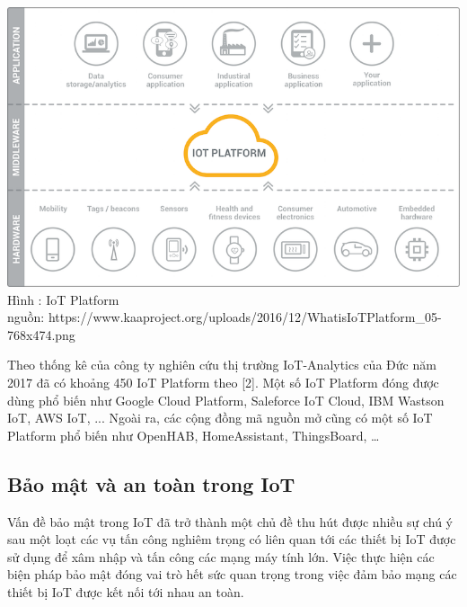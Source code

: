 \begin{center}
	\includegraphics[scale=0.6]{image/IoTPlatform}
	Hình : IoT Platform \\
	nguồn: https://www.kaaproject.org/uploads/2016/12/WhatisIoTPlatform\_05-768x474.png
\end{center}

Theo thống kê của công ty nghiên cứu thị trường IoT-Analytics của Đức năm 2017 đã có khoảng 450 IoT Platform theo [2]. Một số IoT Platform đóng được dùng phổ biến như Google Cloud Platform, Saleforce IoT Cloud, IBM Wastson IoT, AWS IoT, ... Ngoài ra, các cộng đồng mã nguồn mở cũng có một số IoT Platform phổ biến như OpenHAB, HomeAssistant, ThingsBoard, …

\subsection{Bảo mật và an toàn trong IoT}
Vấn đề bảo mật trong IoT đã trở thành một chủ đề thu hút được nhiều sự chú ý sau một loạt các vụ tấn công nghiêm trọng có liên quan tới các thiết bị IoT được sử dụng để xâm nhập và tấn công các mạng máy tính lớn. Việc thực hiện các biện pháp bảo mật đóng vai trò hết sức quan trọng trong việc đảm bảo mạng các thiết bị IoT 
được kết nối tới nhau an toàn.

